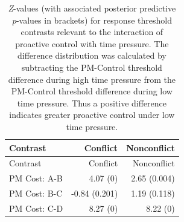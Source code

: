 \documentclass[11pt,]{article}
\begin{document}
\begin{longtable}[]{@{}lrr@{}}
\caption{\emph{Z}-values (with associated posterior predictive
\emph{p}-values in brackets) for response threshold contrasts relevant
to the interaction of proactive control with time pressure. The
difference distribution was calculated by subtracting the PM-Control
threshold difference during high time pressure from the PM-Control
threshold difference during low time pressure. Thus a positive
difference indicates greater proactive control under low time
pressure.}\tabularnewline
\toprule
\begin{minipage}[b]{0.16\columnwidth}\raggedright\strut
Contrast\strut
\end{minipage} & \begin{minipage}[b]{0.18\columnwidth}\raggedleft\strut
Conflict\strut
\end{minipage} & \begin{minipage}[b]{0.18\columnwidth}\raggedleft\strut
Nonconflict\strut
\end{minipage}\tabularnewline
\midrule
\endfirsthead
\toprule
\begin{minipage}[b]{0.16\columnwidth}\raggedright\strut
Contrast\strut
\end{minipage} & \begin{minipage}[b]{0.18\columnwidth}\raggedleft\strut
Conflict\strut
\end{minipage} & \begin{minipage}[b]{0.18\columnwidth}\raggedleft\strut
Nonconflict\strut
\end{minipage}\tabularnewline
\midrule
\endhead
\begin{minipage}[t]{0.16\columnwidth}\raggedright\strut
PM Cost: A-B\strut
\end{minipage} & \begin{minipage}[t]{0.18\columnwidth}\raggedleft\strut
4.07 (0)\strut
\end{minipage} & \begin{minipage}[t]{0.18\columnwidth}\raggedleft\strut
2.65 (0.004)\strut
\end{minipage}\tabularnewline
\begin{minipage}[t]{0.16\columnwidth}\raggedright\strut
PM Cost: B-C\strut
\end{minipage} & \begin{minipage}[t]{0.18\columnwidth}\raggedleft\strut
-0.84 (0.201)\strut
\end{minipage} & \begin{minipage}[t]{0.18\columnwidth}\raggedleft\strut
1.19 (0.118)\strut
\end{minipage}\tabularnewline
\begin{minipage}[t]{0.16\columnwidth}\raggedright\strut
PM Cost: C-D\strut
\end{minipage} & \begin{minipage}[t]{0.18\columnwidth}\raggedleft\strut
8.27 (0)\strut
\end{minipage} & \begin{minipage}[t]{0.18\columnwidth}\raggedleft\strut
8.22 (0)\strut
\end{minipage}\tabularnewline
\bottomrule
\end{longtable}
\end{document}
